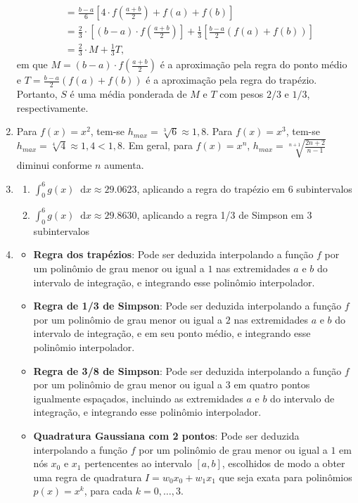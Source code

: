 \documentclass[12pt,a4paper]{article}
\newcommand*\diff{\mathop{}\!\mathrm{d}}
\begin{document}
\begin{enumerate}
\begin{align*}
& = \frac{b - a}{6} \left[ 4\cdot f\left(\frac{a + b}{2}\right) + f(a) + f(b) \right] \\
& = \frac{2}{3} \cdot \left[ (b - a) \cdot f\left(\frac{a + b}{2}\right)\right]
    + \frac{1}{3} \left[ \frac{b - a}{2} \left(f(a) + f(b) \right)\right] \\
& = \frac{2}{3} \cdot M + \frac{1}{3} T,
\end{align*}
em que $M = (b - a) \cdot f\left(\frac{a + b}{2}\right)$ é a aproximação pela regra do ponto médio e $T = \frac{b - a}{2} \left(f(a) + f(b) \right)$ é a aproximação pela regra do trapézio. Portanto, $S$ é uma média ponderada de $M$ e $T$ com pesos $2/3$ e $1/3$, respectivamente.

\item Para $f(x) = x^2$, tem-se $h_{max}=\sqrt[3]{6} \approx 1,8$. Para $f(x) = x^3$, tem-se $h_{max}=\sqrt[4]{4}\approx 1,4 < 1,8$. Em geral, para $f(x) = x^n$, $h_{max}=\sqrt[n+1]{\frac{2n+2}{n-1}}$ diminui conforme $n$ aumenta.
\item
\begin{enumerate}
\item $\int_0^6 g(x)\diff{x} \approx 29.0623$, aplicando a regra do trapézio em $6$ subintervalos
\item $\int_0^6 g(x)\diff{x} \approx 29.8630$, aplicando a regra 1/3 de Simpson em $3$ subintervalos
\end{enumerate}
\item \begin{itemize}
\item \textbf{Regra dos trapézios}: Pode ser deduzida interpolando a função $f$ por um polinômio de grau menor ou igual a $1$ nas extremidades $a$ e $b$ do intervalo de integração, e integrando esse polinômio interpolador.
\item \textbf{Regra de 1/3 de Simpson}: Pode ser deduzida interpolando a função $f$ por um polinômio de grau menor ou igual a $2$ nas extremidades $a$ e $b$ do intervalo de integração, e em seu ponto médio, e integrando esse polinômio interpolador.
\item \textbf{Regra de 3/8 de Simpson}: Pode ser deduzida interpolando a função $f$ por um polinômio de grau menor ou igual a $3$ em quatro pontos igualmente espaçados, incluindo as extremidades $a$ e $b$ do intervalo de integração, e integrando esse polinômio interpolador.
\item \textbf{Quadratura Gaussiana com 2 pontos}: Pode ser deduzida interpolando a função $f$ por um polinômio de grau menor ou igual a $1$ em nós $x_0$ e $x_1$ pertencentes ao intervalo $[a, b]$, escolhidos de modo a obter uma regra de quadratura $I = w_0x_0 + w_1 x_1$ que seja exata para polinômios $p(x) = x^k$, para cada $k=0,\ldots, 3$.

\end{itemize}
\end{enumerate}
\end{document}
